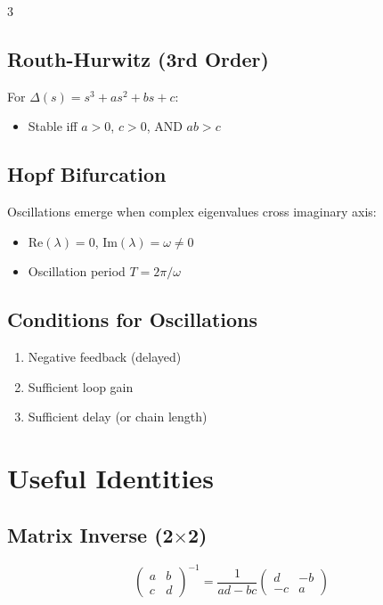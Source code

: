 \documentclass[10pt,landscape,letter]{article}
\begin{document}
\begin{multicols}{3}
\subsection{Routh-Hurwitz (3rd Order)}
For $\Delta(s) = s^3 + as^2 + bs + c$:
\begin{itemize}
\item Stable iff $a > 0$, $c > 0$, AND $ab > c$
\end{itemize}

\subsection{Hopf Bifurcation}
Oscillations emerge when complex eigenvalues cross imaginary axis:
\begin{itemize}
\item $\text{Re}(\lambda) = 0$, $\text{Im}(\lambda) = \omega \neq 0$
\item Oscillation period $T = 2\pi/\omega$
\end{itemize}

\subsection{Conditions for Oscillations}
\begin{enumerate}
\item Negative feedback (delayed)
\item Sufficient loop gain
\item Sufficient delay (or chain length)
\end{enumerate}

\section{Useful Identities}

\subsection{Matrix Inverse (2$\times$2)}
\begin{equation*}
\begin{pmatrix} a & b \\ c & d \end{pmatrix}^{-1} = \frac{1}{ad-bc}\begin{pmatrix} d & -b \\ -c & a \end{pmatrix}
\end{equation*}


\end{multicols}
\end{document}
